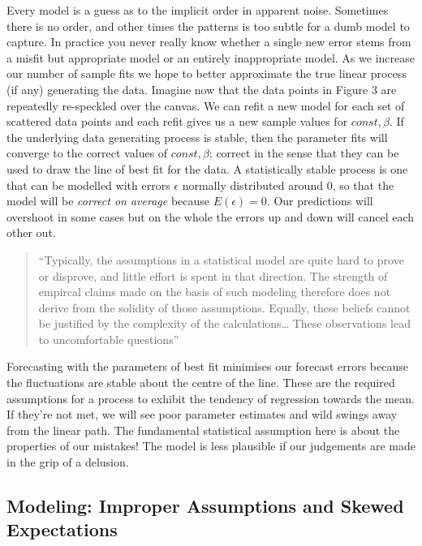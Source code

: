 \documentclass[
]{book}
\theoremstyle{definition}
\theoremstyle{definition}
\theoremstyle{definition}
\theoremstyle{remark}
\begin{document}
Every model is a guess as to the implicit order in apparent noise. Sometimes there is no order, and other times the patterns is too subtle for a dumb model to capture. In practice you never really know whether a single new error stems from a misfit but appropriate model or an entirely inappropriate model. As we increase our number of sample fits we hope to better approximate the true linear process (if any) generating the data. Imagine now that the data points in Figure 3 are repeatedly re-speckled over the canvas. We can refit a new model for each set of scattered data points and each refit gives us a new sample values for \(const, \beta\). If the underlying data generating process is stable, then the parameter fits will converge to the correct values of \(const, \beta\); correct in the sense that they can be used to draw the line of best fit for the data. A statistically stable process is one that can be modelled with errors \(\epsilon\) normally distributed around \(0\), so that the model will be \textit{ correct on average} because \(E(\epsilon) = 0\). Our predictions will overshoot in some cases but on the whole the errors up and down will cancel each other out.

\begin{quote}
``Typically, the assumptions in a statistical model are quite hard to prove or disprove, and little effort is spent in that direction. The strength of empircal claims made on the basis of such modeling therefore does not derive from the solidity of those assumptions. Equally, these beliefs cannot be justified by the complexity of the calculations\ldots{} These observations lead to uncomfortable questions'' \citep{freedman_2009}
\end{quote}

Forecasting with the parameters of best fit minimises our forecast errors because the fluctuations are stable about the centre of the line. These are the required assumptions for a process to exhibit the tendency of regression towards the mean. If they're not met, we will see poor parameter estimates and wild swings away from the linear path. The fundamental statistical assumption here is about the properties of our mistakes! The model is less plausible if our judgements are made in the grip of a delusion.

\hypertarget{modeling-improper-assumptions-and-skewed-expectations}{%
\subsection{Modeling: Improper Assumptions and Skewed Expectations}\label{modeling-improper-assumptions-and-skewed-expectations}}
\end{document}
